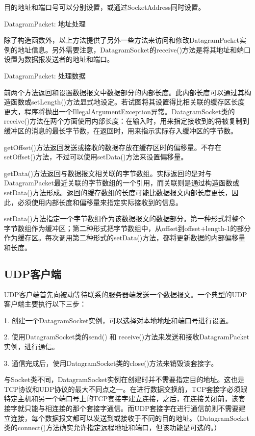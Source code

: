 		目的地址和端口号可以分别设置，或通过SocketAddress同时设置。 

		DatagramPacket: 地址处理 

		

		除了构造函数外，以上方法提供了另外一些方法来访问和修改DatagramPacket实例的地址信息。另外需要注意，DatagramSocket的receive()方法是将其地址和端口设置为数据报发送者的地址和端口。 

		DatagramPacket: 处理数据 

		

		前两个方法返回和设置数据报文中数据部分的内部长度。此内部长度可以通过其构造函数或setLength()方法显式地设定。若试图将其设置得比相关联的缓存区长度更大，程序将抛出一个IllegalArgumentException异常。DatagramSocket类的receive()方法在两个方面使用内部长度：在输入时，用来指定接收到的将被复制到缓冲区的消息的最长字节数，在返回时，用来指示实际存入缓冲区的字节数。 

		getOffset()方法返回发送或接收的数据存放在缓存区时的偏移量。不存在setOffset()方法，不过可以使用setData()方法来设置偏移量。 

		getData()方法返回与数据报文相关联的字节数组。实际返回的是对与DatagramPacket最近关联的字节数组的一个引用，而关联则是通过构造函数或setData()方法形成。返回的缓存数组的长度可能比数据报文内部长度更长，因此，必须使用内部长度和偏移量来指定实际接收到的信息。 

		setData()方法指定一个字节数组作为该数据报文的数据部分。第一种形式将整个字节数组作为缓冲区；第二种形式把字节数组中，从offset到offset+length-1的部分作为缓存区。每次调用第二种形式的setData()方法，都将更新数据的内部偏移量和长度。 

	\subsection{UDP客户端}

		UDP客户端首先向被动等待联系的服务器端发送一个数据报文。一个典型的UDP客户端主要执行以下三步： 

		1. 创建一个DatagramSocket实例，可以选择对本地地址和端口号进行设置。 

		2. 使用DatagramSocket类的send() 和 receive()方法来发送和接收DatagramPacket实例，进行通信。 

		3. 通信完成后，使用DatagramSocket类的close()方法来销毁该套接字。 

		与Socket类不同，DatagramSocket实例在创建时并不需要指定目的地址。这也是TCP协议和UDP协议的最大不同点之一。在进行数据交换前，TCP套接字必须跟特定主机和另一个端口号上的TCP套接字建立连接，之后，在连接关闭前，该套接字就只能与相连接的那个套接字通信。而UDP套接字在进行通信前则不需要建立连接，每个数据报文都可以发送到或接收于不同的目的地址。（DatagramSocket类的connect()方法确实允许指定远程地址和端口，但该功能是可选的。） 

